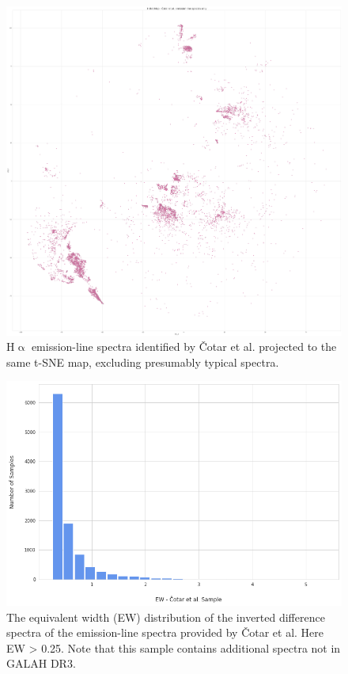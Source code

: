 \begin{figure}[!htb]
\centering
\includegraphics[scale=0.10]{figures/tsne_cotar_only.png}
\caption{H$\upalpha$ emission-line spectra identified by Čotar et al. projected to the same t-SNE map, excluding presumably typical spectra.}
\label{fig5.3}
\end{figure}

\begin{figure}[!htb]
\centering
\includegraphics[scale=0.50]{figures/EW hist cotar.png}
\caption{The equivalent width (EW) distribution of the inverted difference spectra of the emission-line spectra provided by Čotar et al. Here EW > 0.25. Note that this sample contains additional spectra not in GALAH DR3.}
\end{figure}


